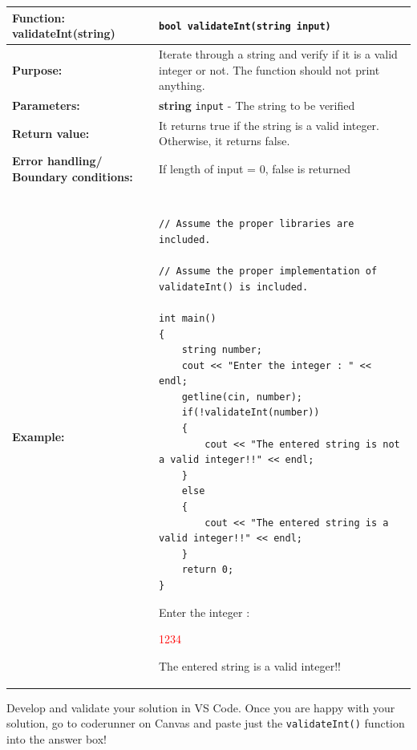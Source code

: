 \begin{table}[H]
    \centering
    \begin{tabular}{|p{1.7in}|p{4.3in}|} \hline
        \textbf{Function:} \newline 
        validateInt(string) & \texttt{bool validateInt(string input)}\\ \hline
        \textbf{Purpose:}  &  Iterate through a string and verify if it is a valid integer or not. The function should not print anything. \\ \hline
        \textbf{Parameters:} &  \hangindent=1cm \textbf{string} \texttt{input} - The string to be verified  \\ \hline
        \textbf{Return value:} &  It returns true if the string is a valid integer. Otherwise, it returns false. \\ \hline
        \textbf{Error handling/} \newline
        \textbf{Boundary conditions:} & If length of input = 0, false is returned  \\ \hline
        \textbf{Example:} & 
        \begin{example}
            \begin{verbatim}
            
// Assume the proper libraries are included.

// Assume the proper implementation of validateInt() is included.

int main()
{
    string number;
    cout << "Enter the integer : " << endl;
    getline(cin, number);
    if(!validateInt(number))
    {
        cout << "The entered string is not a valid integer!!" << endl;
    }
    else
    {
        cout << "The entered string is a valid integer!!" << endl;
    }
    return 0;
}
            \end{verbatim}
        \end{example}

        \begin{sample}
Enter the integer :

\textcolor{red}{1234}

The entered string is a valid integer!!
        \end{sample}
             \\ \hline
    \end{tabular}
\end{table}

Develop and validate your solution in VS Code. Once you are happy with your solution, go to coderunner on Canvas and paste just the \texttt{validateInt()} function into the answer box! 

